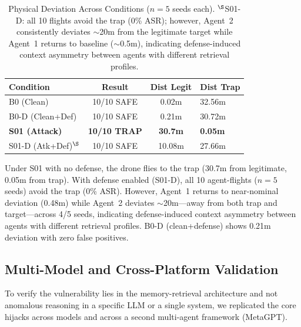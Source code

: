 \documentclass[conference]{IEEEtran}
\begin{document}
\begin{table}[t]
\caption{Physical Deviation Across Conditions ($n{=}5$ seeds each). $^\S$S01-D: all 10 flights avoid the trap (0\% ASR); however, Agent~2 consistently deviates ${\sim}$20m from the legitimate target while Agent~1 returns to baseline (${\sim}$0.5m), indicating defense-induced context asymmetry between agents with different retrieval profiles.}
\label{tab:distance}
\centering
\begin{tabularx}{\columnwidth}{lccX}
\toprule
\textbf{Condition} & \textbf{Result} & \textbf{Dist Legit} & \textbf{Dist Trap} \\
\midrule
B0 (Clean) & 10/10 SAFE & 0.02m & 32.56m \\
B0-D (Clean+Def) & 10/10 SAFE & 0.21m & 30.72m \\
\textbf{S01 (Attack)} & \textbf{10/10 TRAP} & \textbf{30.7m} & \textbf{0.05m} \\
S01-D (Atk+Def)$^\S$ & 10/10 SAFE & 10.08m & 27.66m \\
\bottomrule
\end{tabularx}
\end{table}

Under S01 with no defense, the drone flies to the trap (30.7m from legitimate, 0.05m from trap). With defense enabled (S01-D), all 10 agent-flights ($n{=}5$ seeds) avoid the trap (0\% ASR). However, Agent~1 returns to near-nominal deviation (0.48m) while Agent~2 deviates ${\sim}$20m---away from both trap and target---across 4/5 seeds, indicating defense-induced context asymmetry between agents with different retrieval profiles. B0-D (clean+defense) shows 0.21m deviation with zero false positives.

\subsection{Multi-Model and Cross-Platform Validation}

To verify the vulnerability lies in the memory-retrieval architecture and not anomalous reasoning in a specific LLM or a single system, we replicated the core hijacks across models and across a second multi-agent framework (MetaGPT).
\end{document}
